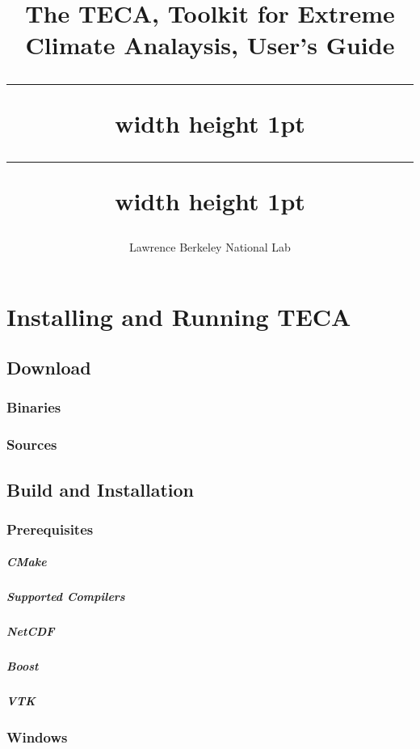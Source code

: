 \documentclass[a4paper,10pt,DIV=12]{scrreprt}
\title{%
The TECA, Toolkit for Extreme Climate Analaysis, User's Guide \\ \vspace{3mm} %
\hrule width \hsize height 1pt \vspace{0.51mm} %
\hrule width \hsize height 1pt}
\subtitle{Lawrence Berkeley National Lab}
\author{}
\begin{document}
\maketitle


\tableofcontents

\chapter{Installing and Running TECA}
\section{Download}
\subsection{Binaries}
\subsection{Sources}
\section{Build and Installation}
\subsection{Prerequisites}
\paragraph{CMake}
\paragraph{Supported Compilers}
\paragraph{NetCDF}
\paragraph{Boost}
\paragraph{VTK}
\subsection{Windows}
\end{document}
